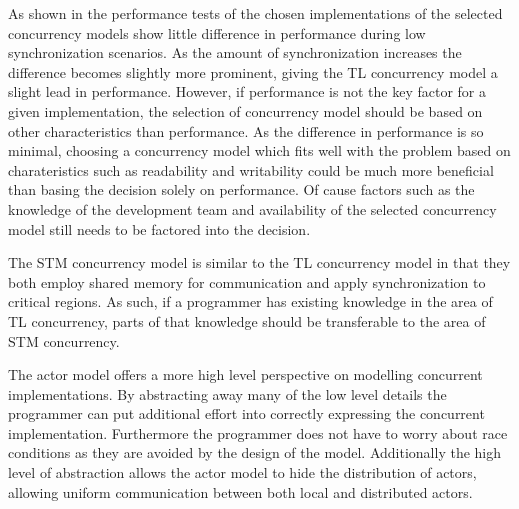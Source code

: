 As shown in the performance tests of  the chosen implementations of the selected concurrency models show little difference in performance during low synchronization scenarios. As the amount of synchronization increases the difference becomes slightly more prominent, giving the \ac{TL} concurrency model a slight lead in performance. However, if performance is not the key factor for a given implementation, the selection of concurrency model should be based on other characteristics than performance. As the difference in performance is so minimal, choosing a concurrency model which fits well with the problem based on charateristics such as readability and writability could be much more beneficial than basing the decision solely on performance. Of cause factors such as the knowledge of the development team and availability of the selected concurrency model still needs to be factored into the decision.

The \ac{STM} concurrency model is similar to the \ac{TL} concurrency model in that they both employ shared memory for communication and apply synchronization to critical regions. As such, if a programmer has existing knowledge in the area of \ac{TL} concurrency, parts of that knowledge should be transferable to the area of \ac{STM} concurrency.

The actor model offers a more high level perspective on modelling concurrent implementations. By abstracting away many of the low level details the programmer can put additional effort into correctly expressing the concurrent implementation. Furthermore the programmer does not have to worry about race conditions as they are avoided by the design of the model. Additionally the high level of abstraction allows the actor model to hide the distribution of actors, allowing uniform communication between both local and distributed actors. 





\worksheetend
